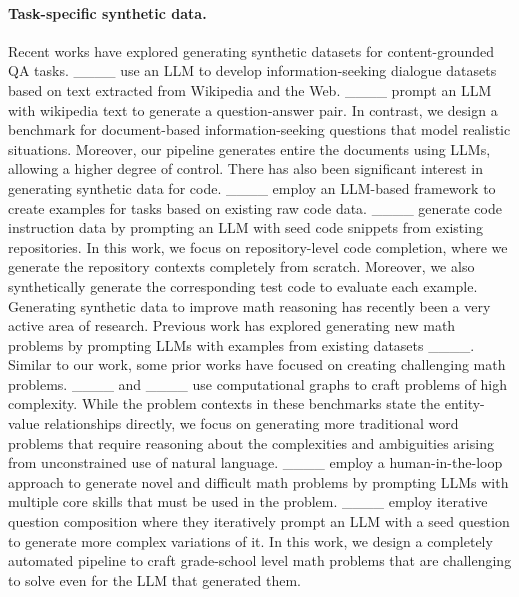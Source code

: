 \paragraph{Task-specific synthetic data.} Recent works have explored generating synthetic datasets for content-grounded QA tasks. ____ 
 use an LLM to develop information-seeking dialogue datasets based on text extracted from Wikipedia and the Web. ____ prompt an LLM with wikipedia text to generate a question-answer pair. In contrast, we design a benchmark for document-based information-seeking questions that model realistic situations. Moreover, our pipeline generates entire the documents using LLMs, allowing a higher degree of control. There has also been significant interest in generating synthetic data for code. ____ employ an LLM-based framework to create examples for tasks based on existing raw code data. ____ generate code instruction data by prompting an LLM with seed code snippets from existing repositories. In this work, we focus on repository-level code completion, where we generate the repository contexts completely from scratch. Moreover, we also synthetically generate the corresponding test code to evaluate each example. Generating synthetic data to improve math reasoning has recently been a very active area of research. Previous work has explored generating new math problems by prompting LLMs with examples from existing datasets ____. Similar to our work, some prior works have focused on creating challenging math problems. ____ and ____ use computational graphs to craft problems of high complexity. While the problem contexts in these benchmarks state the entity-value relationships directly, we focus on generating more traditional word problems that require reasoning about the complexities and ambiguities arising from unconstrained use of natural language. ____ employ a human-in-the-loop approach to generate novel and difficult math problems by prompting LLMs with multiple core skills that must be used in the problem. ____ employ iterative question composition where they iteratively prompt an LLM with a seed question to generate more complex variations of it. In this work, we design a completely automated pipeline to craft grade-school level math problems that are challenging to solve even for the LLM that generated them.